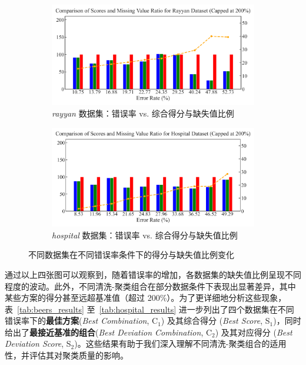 \documentclass[10pt]{article} %
\numberwithin{equation}{section}
\begin{document}
\begin{figure}[H]
  \begin{subfigure}{0.49\linewidth}
    \centering
    \includegraphics[width=\linewidth]{figures/rayyan_error.png}
    \caption{\textit{rayyan} 数据集：错误率 vs. 综合得分与缺失值比例}
    \label{fig:rayyan_error}
  \end{subfigure}
  \hfill
  \begin{subfigure}{0.49\linewidth}
    \centering
    \includegraphics[width=\linewidth]{figures/hospital_error.png}
    \caption{\textit{hospital} 数据集：错误率 vs. 综合得分与缺失值比例}
    \label{fig:hospital_error}
  \end{subfigure}

  \caption{不同数据集在不同错误率条件下的得分与缺失值比例变化}
  \label{fig:all_datasets}
\end{figure}

\vspace{0.5em}
\noindent
通过以上四张图可以观察到，随着错误率的增加，各数据集的缺失值比例呈现不同程度的波动。此外，不同清洗-聚类组合在部分数据条件下表现出显著差异，其中某些方案的得分甚至远超基准值（超过 200\%）。为了更详细地分析这些现象，表~\ref{tab:beers_results} 至~\ref{tab:hospital_results} 进一步列出了四个数据集在不同错误率下的\textbf{最佳方案}(\textit{Best Combination}, C$_1$) 及其综合得分 (\textit{Best Score}, S$_1$)，同时给出了\textbf{最接近基准的组合}(\textit{Best Deviation Combination}, C$_2$) 及其对应得分 (\textit{Best Deviation Score}, S$_2$)。这些结果有助于我们深入理解不同清洗-聚类组合的适用性，并评估其对聚类质量的影响。
\end{document}
